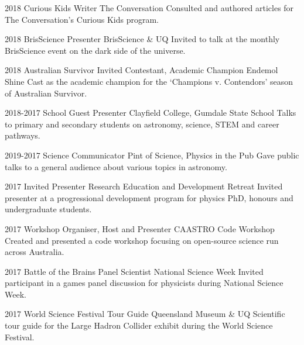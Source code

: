 \begin{entrylist}
\entry
    {2018}
    {Curious Kids Writer}
    {The Conversation}
    {Consulted and authored articles for The Conversation's Curious Kids program.}
\end{entrylist}
\begin{entrylist}
\entry
    {2018}
    {BrisScience Presenter}
    {BrisScience \& UQ}
    {Invited to talk at the monthly BrisScience event on the dark side of the universe.}
\end{entrylist}
\begin{entrylist}
\entry
    {2018}
    {Australian Survivor Invited Contestant, Academic Champion}
    {Endemol Shine}
    {Cast as the academic champion for the `Champions v. Contendors' season of Australian Survivor.}
\end{entrylist}
\begin{entrylist}
\entry
    {2018-2017}
    {School Guest Presenter}
    {Clayfield College, Gumdale State School}
    {Talks to primary and secondary students on astronomy, science, STEM and career pathways.}
\end{entrylist}
\begin{entrylist}
\entry
   {2019-2017}
   {Science Communicator}
   {Pint of Science, Physics in the Pub}
   {Gave public talks to a general audience about various topics in astronomy.}
\end{entrylist}
\begin{entrylist}
\entry
    {2017}
    {Invited Presenter}
    {Research Education and Development Retreat}
    {Invited presenter at a progressional development program for physics PhD, honours and undergraduate students.}
\end{entrylist}
\begin{entrylist}
\entry
    {2017}
    {Workshop Organiser, Host and Presenter}
    {CAASTRO Code Workshop}
    {Created and presented a code workshop focusing on open-source science run across Australia.}
\end{entrylist}
\begin{entrylist}
\entry
    {2017}
    {Battle of the Brains Panel Scientist}
    {National Science Week}
    {Invited participant in a games panel discussion for physicists during National Science Week.}
\end{entrylist}
\begin{entrylist}
\entry
    {2017}
    {World Science Festival Tour Guide}
    {Queensland Museum \& UQ}
    {Scientific tour guide for the Large Hadron Collider exhibit during the World Science Festival.}
\end{entrylist}
